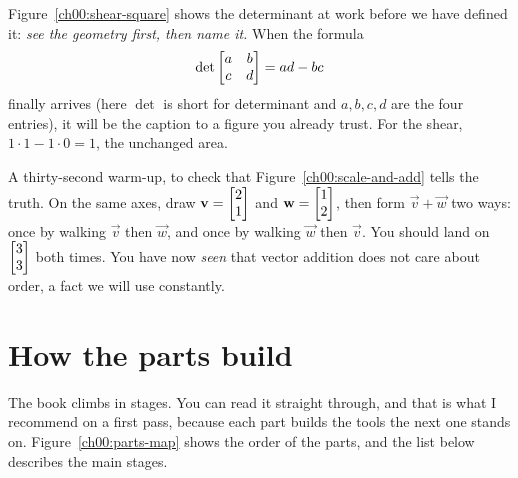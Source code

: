 Figure~\ref{ch00:shear-square} shows the determinant at work before we have
defined it: \emph{see the geometry first, then name it.} When the formula
\[
\det\begin{bmatrix}a & b \\ c & d\end{bmatrix} = ad - bc
\]
finally arrives (here $\det$ is short for determinant and $a,b,c,d$ are the four
entries), it will be the caption to a figure you already trust. For the shear,
$1\cdot 1 - 1\cdot 0 = 1$, the unchanged area.

\begin{labbox}
A thirty-second warm-up, to check that Figure~\ref{ch00:scale-and-add} tells the truth. On the
same axes, draw $\mathbf{v} = \begin{bmatrix}2 \\ 1\end{bmatrix}$ and $\mathbf{w} = \begin{bmatrix}1 \\ 2\end{bmatrix}$, then
form $\vec{v}+\vec{w}$ two ways: once by walking $\vec{v}$ then $\vec{w}$, and once
by walking $\vec{w}$ then $\vec{v}$. You should land on $\begin{bmatrix}3\\3\end{bmatrix}$ both times.
You have now \emph{seen} that vector addition does not care about order, a fact
we will use constantly.
\end{labbox}

\section*{How the parts build}

The book climbs in stages. You can read it straight through, and that
is what I recommend on a first pass, because each part builds the tools
the next one stands on. Figure~\ref{ch00:parts-map} shows the order of the parts,
and the list below describes the main stages.

